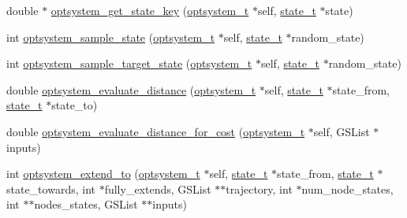 \begin{DoxyCompactItemize}
\item 
double $\ast$ \hyperlink{a00017_a4748b851e592ba16255987990df866dc_a4748b851e592ba16255987990df866dc}{optsystem\-\_\-get\-\_\-state\-\_\-key} (\hyperlink{a00018_a48d08bbb4534f55ba817743a2b91360c_a48d08bbb4534f55ba817743a2b91360c}{optsystem\-\_\-t} $\ast$self, \hyperlink{a00018_a1c9d0bb39483d4981491e6383b0dbb47_a1c9d0bb39483d4981491e6383b0dbb47}{state\-\_\-t} $\ast$state)
\item 
int \hyperlink{a00017_a778500228810cbc69a6d17494f889b87_a778500228810cbc69a6d17494f889b87}{optsystem\-\_\-sample\-\_\-state} (\hyperlink{a00018_a48d08bbb4534f55ba817743a2b91360c_a48d08bbb4534f55ba817743a2b91360c}{optsystem\-\_\-t} $\ast$self, \hyperlink{a00018_a1c9d0bb39483d4981491e6383b0dbb47_a1c9d0bb39483d4981491e6383b0dbb47}{state\-\_\-t} $\ast$random\-\_\-state)
\item 
int \hyperlink{a00017_a2294e6525f29f89ef7c0e3424063df15_a2294e6525f29f89ef7c0e3424063df15}{optsystem\-\_\-sample\-\_\-target\-\_\-state} (\hyperlink{a00018_a48d08bbb4534f55ba817743a2b91360c_a48d08bbb4534f55ba817743a2b91360c}{optsystem\-\_\-t} $\ast$self, \hyperlink{a00018_a1c9d0bb39483d4981491e6383b0dbb47_a1c9d0bb39483d4981491e6383b0dbb47}{state\-\_\-t} $\ast$random\-\_\-state)
\item 
double \hyperlink{a00017_afce48612176b92f14cb7ffcc91259454_afce48612176b92f14cb7ffcc91259454}{optsystem\-\_\-evaluate\-\_\-distance} (\hyperlink{a00018_a48d08bbb4534f55ba817743a2b91360c_a48d08bbb4534f55ba817743a2b91360c}{optsystem\-\_\-t} $\ast$self, \hyperlink{a00018_a1c9d0bb39483d4981491e6383b0dbb47_a1c9d0bb39483d4981491e6383b0dbb47}{state\-\_\-t} $\ast$state\-\_\-from, \hyperlink{a00018_a1c9d0bb39483d4981491e6383b0dbb47_a1c9d0bb39483d4981491e6383b0dbb47}{state\-\_\-t} $\ast$state\-\_\-to)
\item 
double \hyperlink{a00017_acb788463670e5a6ef08d3759e8fc22ba_acb788463670e5a6ef08d3759e8fc22ba}{optsystem\-\_\-evaluate\-\_\-distance\-\_\-for\-\_\-cost} (\hyperlink{a00018_a48d08bbb4534f55ba817743a2b91360c_a48d08bbb4534f55ba817743a2b91360c}{optsystem\-\_\-t} $\ast$self, \-G\-S\-List $\ast$inputs)
\item 
int \hyperlink{a00017_a10f9c56911d68043e9357824ef0440bc_a10f9c56911d68043e9357824ef0440bc}{optsystem\-\_\-extend\-\_\-to} (\hyperlink{a00018_a48d08bbb4534f55ba817743a2b91360c_a48d08bbb4534f55ba817743a2b91360c}{optsystem\-\_\-t} $\ast$self, \hyperlink{a00018_a1c9d0bb39483d4981491e6383b0dbb47_a1c9d0bb39483d4981491e6383b0dbb47}{state\-\_\-t} $\ast$state\-\_\-from, \hyperlink{a00018_a1c9d0bb39483d4981491e6383b0dbb47_a1c9d0bb39483d4981491e6383b0dbb47}{state\-\_\-t} $\ast$state\-\_\-towards, int $\ast$fully\-\_\-extends, \-G\-S\-List $\ast$$\ast$trajectory, int $\ast$num\-\_\-node\-\_\-states, int $\ast$$\ast$nodes\-\_\-states, \-G\-S\-List $\ast$$\ast$inputs)
$$
\end{DoxyCompactItemize}
